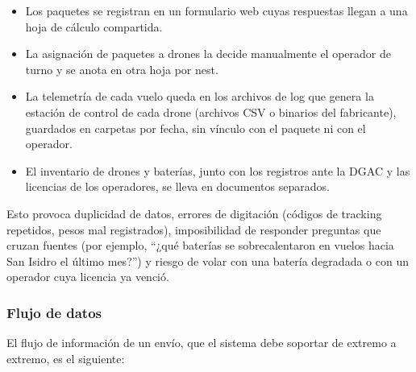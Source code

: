 \documentclass[11pt,a4paper]{article}
\begin{document}
\begin{itemize}
\item Los paquetes se registran en un formulario web cuyas respuestas llegan a una hoja de cálculo compartida.
\item La asignación de paquetes a drones la decide manualmente el operador de turno y se anota en otra hoja por nest.
\item La telemetría de cada vuelo queda en los archivos de log que genera la estación de control de cada drone (archivos CSV o binarios del fabricante), guardados en carpetas por fecha, sin vínculo con el paquete ni con el operador.
\item El inventario de drones y baterías, junto con los registros ante la DGAC y las licencias de los operadores, se lleva en documentos separados.
\end{itemize}

Esto provoca duplicidad de datos, errores de digitación (códigos de tracking repetidos, pesos mal registrados), imposibilidad de responder preguntas que cruzan fuentes (por ejemplo, ``¿qué baterías se sobrecalentaron en vuelos hacia San Isidro el último mes?'') y riesgo de volar con una batería degradada o con un operador cuya licencia ya venció.

\subsubsection{Flujo de datos}
El flujo de información de un envío, que el sistema debe soportar de extremo a extremo, es el siguiente:
\end{document}
